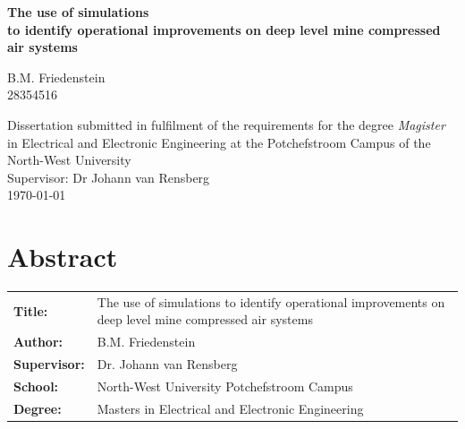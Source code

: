 \documentclass[12pt, english, oneside, open=any]{report}
\begin{document}
	
\begin{titlepage}
	\BgThispage	
		\vspace{0cm}
		\begin{center}
			\textbf{\singlespacing\huge{The use of simulations \\ to identify operational improvements on deep level mine compressed air systems}\\
			}\par
			\vspace{3cm}
			\LARGE{B.M. Friedenstein \\28354516}\\
		\end{center}
	
	\vspace{2cm}
	
\begin{flushleft}
	{\singlespacing\centering \large Dissertation submitted in fulfilment of the requirements for the degree {\color{blue} \textit{Magister}} in {\color{blue}Electrical and Electronic Engineering} at the Potchefstroom Campus of the North-West University\\
	}
	\vspace{2cm}
	{\large \setlength{\parindent}{0.5cm} Supervisor: Dr Johann van Rensberg \\
	\vspace{2cm}
	\large{\monthyeardate\today}\\		
	}
\end{flushleft}
\end{titlepage}
\clearpage
\section*{Abstract}
	\vspace{0.2cm}
	\thispagestyle{plain}
	\setcounter{page}{2}
	\begin{tabular}{p{2.35cm}p{13cm}}
		\textbf{Title:} & The use of simulations to identify operational improvements on deep level mine compressed air systems\  \\
		\textbf{Author:} & B.M. Friedenstein \\
		\textbf{Supervisor:} & Dr. Johann van Rensberg \\
		\textbf{School:} & North-West University Potchefstroom Campus\\
		\textbf{Degree:} & Masters in Electrical and Electronic Engineering \\
	\end{tabular}
	\vspace{1cm}
\end{document}
